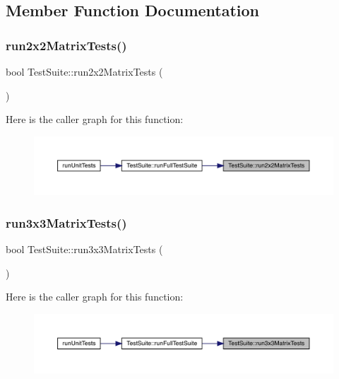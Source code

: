 \subsection{Member Function Documentation}
\mbox{\label{class_test_suite_acf6d1ad1920132a4aed74457bb2df8cb}} 
\subsubsection{\texorpdfstring{run2x2MatrixTests()}{run2x2MatrixTests()}}
{\footnotesize\ttfamily bool Test\+Suite\+::run2x2\+Matrix\+Tests (\begin{DoxyParamCaption}{ }\end{DoxyParamCaption})}

Here is the caller graph for this function\+:\nopagebreak
\begin{figure}[H]
\begin{center}
\leavevmode
\includegraphics[width=350pt]{class_test_suite_acf6d1ad1920132a4aed74457bb2df8cb_icgraph}
\end{center}
\end{figure}
\mbox{\label{class_test_suite_a91444c36a86d453cc9922d888b248a6b}} 
\subsubsection{\texorpdfstring{run3x3MatrixTests()}{run3x3MatrixTests()}}
{\footnotesize\ttfamily bool Test\+Suite\+::run3x3\+Matrix\+Tests (\begin{DoxyParamCaption}{ }\end{DoxyParamCaption})}

Here is the caller graph for this function\+:\nopagebreak
\begin{figure}[H]
\begin{center}
\leavevmode
\includegraphics[width=350pt]{class_test_suite_a91444c36a86d453cc9922d888b248a6b_icgraph}
\end{center}
\end{figure}
\mbox{\label{class_test_suite_a0597dcd7c68390ac33d8095f2a76ae0f}} 
